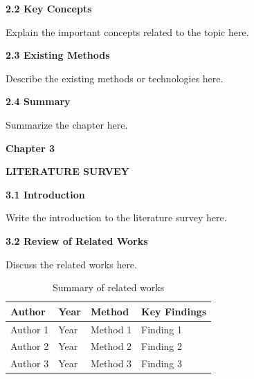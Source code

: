\documentclass[12pt]{article}
\begin{document}
\vspace{0.5cm}

\noindent
\textbf{2.2 Key Concepts}

\vspace{0.25cm}

Explain the important concepts related to the topic here.

\vspace{0.5cm}

\noindent
\textbf{2.3 Existing Methods}

\vspace{0.25cm}

Describe the existing methods or technologies here.

\vspace{0.5cm}

\noindent
\textbf{2.4 Summary}

\vspace{0.25cm}

Summarize the chapter here.

\newpage

\begin{center}
\textbf{\Large Chapter 3}
\end{center}

\vspace{0.4cm}

\begin{center}
\textbf{\Large LITERATURE SURVEY}
\end{center}

\vspace{0.6cm}

\noindent
\textbf{3.1 Introduction}

\vspace{0.25cm}

Write the introduction to the literature survey here.

\vspace{0.5cm}

\noindent
\textbf{3.2 Review of Related Works}

\vspace{0.25cm}

Discuss the related works here.

\vspace{0.5cm}

\begin{table}[h!]
\centering
\renewcommand{\arraystretch}{1.4}
\begin{tabular}{|p{3cm}|p{2cm}|p{3cm}|p{4cm}|}
\hline
\textbf{Author} & \textbf{Year} & \textbf{Method} & \textbf{Key Findings} \\
\hline
Author 1 & Year & Method 1 & Finding 1 \\
\hline
Author 2 & Year & Method 2 & Finding 2 \\
\hline
Author 3 & Year & Method 3 & Finding 3 \\
\hline
\end{tabular}
\caption{Summary of related works}
\label{tab:literature}
\end{table}
\end{document}
